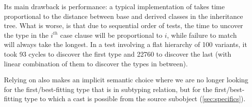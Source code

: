 \noindent
Its main drawback is performance: a typical implementation of 
 takes time proportional to the distance between base and 
derived classes in the inheritance tree. What is worse, is that due to 
sequential order of tests, the time to uncover the type in the $i^{th}$ case 
clause will be proportional to $i$, while failure to match will always take the longest. 
In a test involving a flat hierarchy of 100 variants, it took 93 cycles to 
discover the first type and 22760 to discover the last (with linear combination 
of them to discover the types in between). %

Relying on  also makes an implicit semantic choice where we 
are no longer looking for the first/best-fitting type that is in subtyping 
relation, but for the first/best-fitting type to which a cast is possible from 
the source subobject (\textsection\ref{sec:specifics}).



